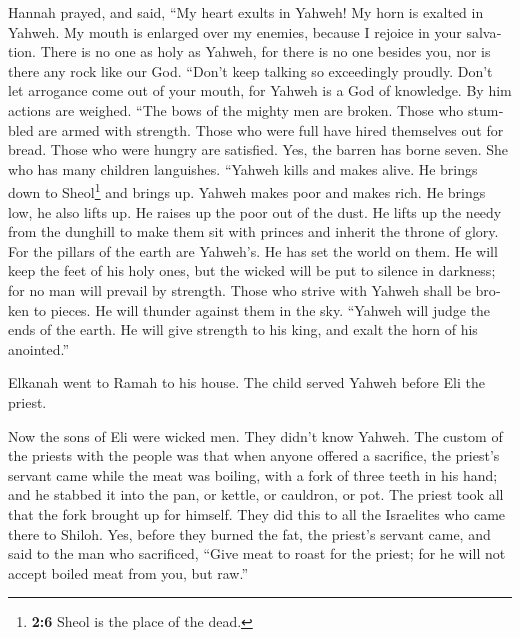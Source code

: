 \begin{paracol}{2}
\begin{otherlanguage}{english}
 Hannah prayed, and said, ``My heart exults in Yahweh! My
horn is exalted in Yahweh. My mouth is enlarged over my enemies, because
I rejoice in your salvation.  There is no one as holy as
Yahweh, for there is no one besides you, nor is there any rock like our
God.  ``Don't keep talking so exceedingly proudly. Don't
let arrogance come out of your mouth, for Yahweh is a God of knowledge.
By him actions are weighed.  ``The bows of the mighty men
are broken. Those who stumbled are armed with strength. 
Those who were full have hired themselves out for bread. Those who were
hungry are satisfied. Yes, the barren has borne seven. She who has many
children languishes.  ``Yahweh kills and makes alive. He
brings down to Sheol\footnote{\textbf{2:6} Sheol is the place of the
  dead.} and brings up.  Yahweh makes poor and makes rich.
He brings low, he also lifts up.  He raises up the poor
out of the dust. He lifts up the needy from the dunghill to make them
sit with princes and inherit the throne of glory. For the pillars of the
earth are Yahweh's. He has set the world on them.  He will
keep the feet of his holy ones, but the wicked will be put to silence in
darkness; for no man will prevail by strength.  Those who
strive with Yahweh shall be broken to pieces. He will thunder against
them in the sky. ``Yahweh will judge the ends of the earth. He will give
strength to his king, and exalt the horn of his anointed.''

 Elkanah went to Ramah to his house. The child served
Yahweh before Eli the priest.

 Now the sons of Eli were wicked men. They didn't know
Yahweh.  The custom of the priests with the people was
that when anyone offered a sacrifice, the priest's servant came while
the meat was boiling, with a fork of three teeth in his hand;
 and he stabbed it into the pan, or kettle, or cauldron,
or pot. The priest took all that the fork brought up for himself. They
did this to all the Israelites who came there to Shiloh. 
Yes, before they burned the fat, the priest's servant came, and said to
the man who sacrificed, ``Give meat to roast for the priest; for he will
not accept boiled meat from you, but raw.''


\end{otherlanguage}
\end{paracol}
